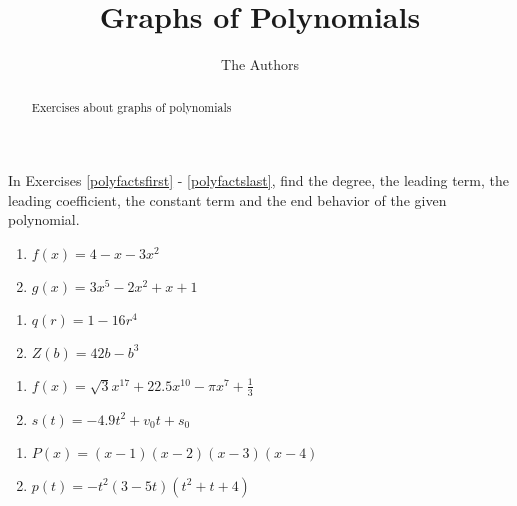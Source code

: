 \documentclass{ximera}
\author{The Authors}
\title{Graphs of Polynomials}
\begin{document}
\begin{abstract}
Exercises about graphs of polynomials
\end{abstract}
\maketitle

\renewcommand{\theenumi}{\arabic{enumi}.}

In Exercises \ref{polyfactsfirst} - \ref{polyfactslast}, find the degree, the leading term, the leading coefficient, the constant term and the end behavior of the given polynomial.

\begin{enumerate}

\item  $f(x) = 4-x-3x^2$ \label{polyfactsfirst}
\item  $g(x) = 3x^5 - 2x^2 + x + 1$

\setcounter{HW}{\value{enumi}}
\end{enumerate}

\begin{enumerate}
\setcounter{enumi}{\value{HW}}

\item $q(r) = 1 - 16r^{4}$
\item $Z(b) = 42b - b^{3}$

\setcounter{HW}{\value{enumi}}
\end{enumerate}


\begin{enumerate}
\setcounter{enumi}{\value{HW}}

\item $f(x) = \sqrt{3}x^{17} + 22.5x^{10} - \pi x^{7} + \frac{1}{3}$
\item $s(t) = -4.9t^{2} + v_{0}t + s_{0}$

\setcounter{HW}{\value{enumi}}
\end{enumerate}

\begin{enumerate}
\setcounter{enumi}{\value{HW}}

\item $P(x) = (x - 1)(x - 2)(x - 3)(x - 4)$
\item $p(t) = -t^2(3 - 5t)(t^{2} + t + 4)$

\setcounter{HW}{\value{enumi}}
\end{enumerate}
\end{document}
